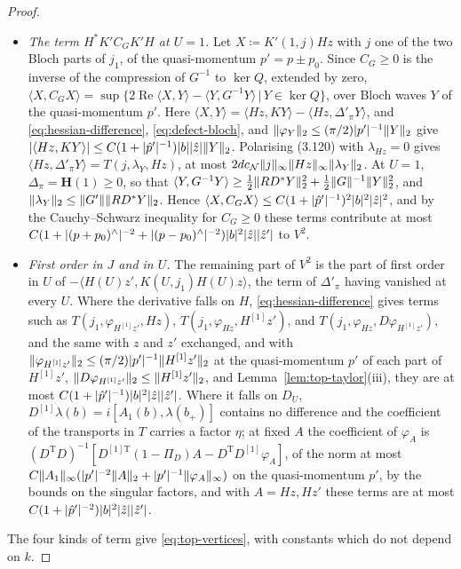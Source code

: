 \documentclass[11pt]{preprint}
\DeclarePairedDelimiter{\abs}{\lvert}{\rvert}
\DeclarePairedDelimiter{\norm}{\lVert}{\rVert}
\numberwithin{equation}{section}
\theoremstyle{definition}
\theoremstyle{remark}
\theoremstyle{plain}
\begin{document}
\begin{proof}
\begin{itemize}
\item \emph{The term $H^*K'C_GK'H$ at $U = 1$.} Let $X \coloneqq K'(1, j)Hz$ with $j$ one of the two Bloch parts of $j_1$, of the quasi-momentum $p' = p \pm p_0$. Since $C_G \geq 0$ is the inverse of the compression of $G^{-1}$ to $\ker Q$, extended by zero, $\langle X, C_GX \rangle = \sup\{ 2\operatorname{Re}\langle X, Y \rangle - \langle Y, G^{-1}Y \rangle \, | \, Y \in \ker Q \}$, over Bloch waves $Y$ of the quasi-momentum $p'$. Here $\langle X, Y \rangle = \langle Hz, KY \rangle - \langle Hz, \Delta'_\pi Y \rangle$, and \eqref{eq:hessian-difference}, \eqref{eq:defect-bloch}, and $\norm{\varphi_Y}_2 \leq (\pi/2)\abs{p'}^{-1}\norm{Y}_2$ give $\abs{\langle Hz, KY \rangle} \leq C(1 + \abs{\hat p'}^{-1})\abs{b}\abs{\hat z}\norm{Y}_2$. Polarising (3.120) with $\lambda_{Hz} = 0$ gives $\langle Hz, \Delta'_\pi Y \rangle = T(j, \lambda_Y, Hz)$, at most $2dc_{\mathcal N}\norm{j}_\infty\norm{Hz}_\infty\norm{\lambda_Y}_2$. At $U = 1$, $\Delta_\pi = \mathbf H(1) \geq 0$, so that $\langle Y, G^{-1}Y \rangle \geq \frac12\norm{RD^*Y}_2^2 + \frac12\norm{G}^{-1}\norm{Y}_2^2$, and $\norm{\lambda_Y}_2 \leq \norm{G'}\norm{RD^*Y}_2$. Hence $\langle X, C_GX \rangle \leq C(1 + \abs{\hat p'}^{-1})^2\abs{b}^2\abs{\hat z}^2$, and by the Cauchy--Schwarz inequality for $C_G \geq 0$ these terms contribute at most $C(1 + \abs{(p + p_0)^\wedge}^{-2} + \abs{(p - p_0)^\wedge}^{-2})\abs{b}^2\abs{\hat z}\abs{\hat z'}$ to $V^2$.
\item \emph{First order in $J$ and in $U$.} The remaining part of $V^2$ is the part of first order in $U$ of $-\langle H(U)z', K(U, j_1)H(U)z \rangle$, the term of $\Delta'_\pi$ having vanished at every $U$. Where the derivative falls on $H$, \eqref{eq:hessian-difference} gives terms such as $T(j_1, \varphi_{H^{[1]}z'}, Hz)$, $T(j_1, \varphi_{Hz}, H^{[1]}z')$, and $T(j_1, \varphi_{Hz}, D\varphi_{H^{[1]}z'})$, and the same with $z$ and $z'$ exchanged, and with $\norm{\varphi_{H^{[1]}z'}}_2 \leq (\pi/2)\abs{p'}^{-1}\norm{H^{[1]}z'}_2$ at the quasi-momentum $p'$ of each part of $H^{[1]}z'$, $\norm{D\varphi_{H^{[1]}z'}}_2 \leq \norm{H^{[1]}z'}_2$, and Lemma~\ref{lem:top-taylor}(iii), they are at most $C(1 + \abs{\hat p'}^{-1})\abs{b}^2\abs{\hat z}\abs{\hat z'}$. Where it falls on $D_U$, $D^{[1]}\lambda(b) = i[A_1(b), \lambda(b_+)]$ contains no difference and the coefficient of the transports in $T$ carries a factor $\eta$; at fixed $A$ the coefficient of $\varphi_A$ is $(D^{\mathrm T}D)^{-1}[D^{[1]\mathrm T}(1 - \Pi_D)A - D^{\mathrm T}D^{[1]}\varphi_A]$, of the norm at most $C\norm{A_1}_\infty(\abs{p'}^{-2}\norm{A}_2 + \abs{p'}^{-1}\norm{\varphi_A}_\infty)$ on the quasi-momentum $p'$, by the bounds on the singular factors, and with $A = Hz, Hz'$ these terms are at most $C(1 + \abs{\hat p'}^{-2})\abs{b}^2\abs{\hat z}\abs{\hat z'}$.
\end{itemize}
The four kinds of term give \eqref{eq:top-vertices}, with constants which do not depend on $k$.


\end{proof}
\end{document}
